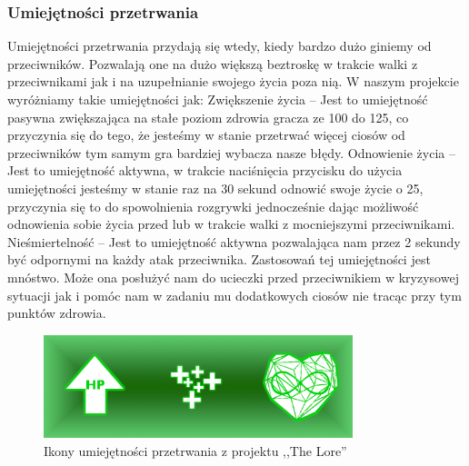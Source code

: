 \documentclass[oneside,polski,logo]{amuthesis}
\begin{document}
\subsubsection{Umiejętności przetrwania}
Umiejętności przetrwania przydają się wtedy, kiedy bardzo dużo giniemy od przeciwników. Pozwalają one na dużo większą beztroskę w trakcie walki z przeciwnikami jak i na uzupełnianie swojego życia poza nią. W naszym projekcie wyróżniamy takie umiejętności jak:
Zwiększenie życia – Jest to umiejętność pasywna zwiększająca na stałe poziom zdrowia gracza ze 100 do 125, co przyczynia się do tego, że jesteśmy w stanie przetrwać więcej ciosów od przeciwników tym samym gra bardziej wybacza nasze błędy.
Odnowienie życia – Jest to umiejętność aktywna, w trakcie naciśnięcia przycisku do użycia umiejętności jesteśmy w stanie raz na 30 sekund odnowić swoje życie o 25, przyczynia się to do spowolnienia rozgrywki jednocześnie dając możliwość odnowienia sobie życia przed lub w trakcie walki z mocniejszymi przeciwnikami.
Nieśmiertelność – Jest to umiejętność aktywna pozwalająca nam przez 2 sekundy być odpornymi na każdy atak przeciwnika. Zastosowań tej umiejętności jest mnóstwo. Może ona posłużyć nam do ucieczki przed przeciwnikiem w kryzysowej sytuacji jak i pomóc nam w zadaniu mu dodatkowych ciosów nie tracąc przy tym punktów zdrowia. 

\begin{figure}[h]
	\centering
	\includegraphics[width=9cm]{images/kozubal/patience.png}
	\caption{Ikony umiejętności przetrwania z projektu ,,The Lore''}
\end{figure}
\end{document}
